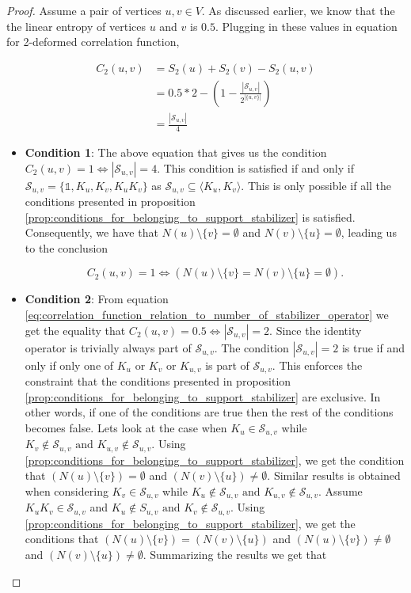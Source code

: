 \documentclass{article}
\newcommand{\identity}{\mathds{1}}
\begin{document}
\begin{proof}
    
Assume a pair of vertices $u, v \in V$. As discussed earlier, we know that the the linear entropy of vertices $u$ and $v$ is $0.5$. Plugging in these values in equation for 2-deformed correlation function, 

\begin{align}
    C_2(u, v) &= S_2(u) + S_2(v) - S_2(u, v) \\
    &=0.5 * 2 - \left(1 - \frac{|\mathcal{S}_{u,v}|}{2^{|\{u,v\}|}}\right) \\
\label{eq:correlation_function_relation_to_number_of_stabilizer_operator}
    &= \frac{|\mathcal{S}_{u,v}|}{4} 
\end{align}
\begin{itemize}
    \item \textbf{Condition 1}: The above equation that gives us the condition $ C_2(u, v) = 1 \iff |\mathcal{S}_{u,v}| = 4 $. This condition is satisfied if and only if $ \mathcal{S}_{u,v} = \{\identity, K_u, K_v, K_uK_v\} $ as $\mathcal{S}_{u,v} \subseteq \langle K_u, K_v \rangle$. This is only possible if all the conditions presented in proposition \ref{prop:conditions_for_belonging_to_support_stabilizer} is satisfied. Consequently, we have that $ N(u) \setminus \{v\} = \emptyset $ and $ N(v) \setminus \{u\} = \emptyset $, leading us to the conclusion

    \begin{equation}
    C_2(u, v) = 1 \iff (N(u) \setminus \{v\} = N(v) \setminus \{u\} = \emptyset).
    \end{equation}
    
    \item \textbf{Condition 2}: From equation \ref{eq:correlation_function_relation_to_number_of_stabilizer_operator} we get the equality that  $ C_2(u, v) = 0.5 \iff |\mathcal{S}_{u,v}| = 2 $. Since the identity operator is trivially always part of $\mathcal{S}_{u,v}$. The condition $|\mathcal{S}_{u,v}| = 2 $ is true if and only if only one of $K_u$ or $K_v$ or $K_{u, v}$ is part of $\mathcal{S}_{u,v}$. This enforces the constraint that the conditions presented in proposition \ref{prop:conditions_for_belonging_to_support_stabilizer} are exclusive. In other words, if one of the conditions are true then the rest of the conditions becomes false. 
    Lets look at the case when $K_u \in \mathcal{S}_{u,v}$ while $K_v \not \in \mathcal{S}_{u, v} \text{ and } K_{u, v} \not \in \mathcal{S}_{u, v}$. Using \ref{prop:conditions_for_belonging_to_support_stabilizer}, we get the condition that $(N(u) \setminus \{v\}) = \emptyset $ and $(N(v) \setminus \{u\}) \neq \emptyset $. Similar results is obtained when considering $K_v \in \mathcal{S}_{u,v}$ while $K_u \not \in \mathcal{S}_{u, v} \text{ and } K_{u, v} \not \in \mathcal{S}_{u, v}$. 
    Assume $K_uK_v \in \mathcal{S}_{u,v}$ and $K_u \not \in S_{u, v} \text{ and } K_v \not \in \mathcal{S}_{u, v}$. Using \ref{prop:conditions_for_belonging_to_support_stabilizer}, we get the conditions that $ (N(u) \setminus \{v\}) = (N(v) \setminus \{u\}) $ and $(N(u) \setminus \{v\}) \neq \emptyset$ and $(N(v) \setminus \{u\}) \neq \emptyset$. Summarizing the results we get that 
    

\end{itemize}
\end{proof}
\end{document}
